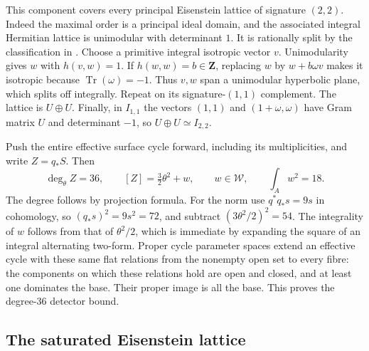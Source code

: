 \documentclass[11pt]{article}
\theoremstyle{definition}
\theoremstyle{remark}
\newcommand{\Z}{\mathbf Z}
\begin{document}
This component covers every principal Eisenstein lattice of signature $(2,2)$. Indeed the maximal order is a principal ideal domain, and the associated integral Hermitian lattice is unimodular with determinant $1$. It is rationally split by the classification in \cite[Proposition~4.1 and Corollary~4.2]{Deligne82}. Choose a primitive integral isotropic vector $v$. Unimodularity gives $w$ with $h(v,w)=1$. If $h(w,w)=b\in\Z$, replacing $w$ by $w+b\omega v$ makes it isotropic because $\operatorname{Tr}(\omega)=-1$. Thus $v,w$ span a unimodular hyperbolic plane, which splits off integrally. Repeat on its signature-$(1,1)$ complement. The lattice is $U\oplus U$. Finally, in $I_{1,1}$ the vectors $(1,1)$ and $(1+\omega,\omega)$ have Gram matrix $U$ and determinant $-1$, so $U\oplus U\simeq I_{2,2}$.

Push the entire effective surface cycle forward, including its multiplicities, and write $Z=q_*S$. Then
\begin{equation}\label{eq:degree36-class}
 \deg_\theta Z=36,\qquad
 [Z]=\tfrac32\theta^2+w,\qquad
 w\in\mathcal W,\qquad \int_Aw^2=18.
\end{equation}
The degree follows by projection formula. For the norm use $q^*q_*s=9s$ in cohomology, so $(q_*s)^2=9s^2=72$, and subtract $(3\theta^2/2)^2=54$. The integrality of $w$ follows from that of $\theta^2/2$, which is immediate by expanding the square of an integral alternating two-form. Proper cycle parameter spaces extend an effective cycle with these same flat relations from the nonempty open set to every fibre: the components on which these relations hold are open and closed, and at least one dominates the base. Their proper image is all the base. This proves the degree-$36$ detector bound.

\subsection{The saturated Eisenstein lattice}
\end{document}
